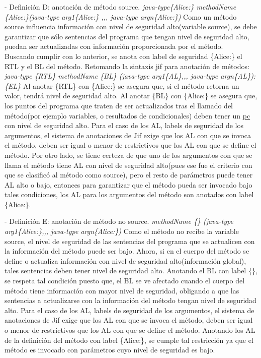- Definición D: anotación de método source.\newline 
\emph{java-type\{Alice:\}  methodName \{Alice:\}(java-type arg1\{Alice:\} ,,,
java-type argn\{Alice:\})}
Como un método source influencia información con nivel de seguridad alto(variable
source), se debe garantizar que sólo sentencias del programa que tengan nivel de
seguridad alto, puedan ser actualizadas con información proporcionada por el método.\\
Buscando cumplir con lo anterior, se anota con label de
seguridad \{Alice:\} el RTL y el BL del método.
Retomando la sintaxis jif para anotación de métodos:\newline 
\emph{java-type \{RTL\} methodName \{BL\} (java-type arg1\{AL\},,, java-type argn\{AL\}):\{EL\} }\newline
Al anotar \{RTL\} con \{Alice:\} se asegura que, si el método retorna un valor,
tendrá nivel de seguridad alto.\newline
Al anotar \{BL\} con \{Alice:\} se asegura que, los puntos del programa que
traten de ser actualizados tras el llamado del método(por ejemplo variables, o
resultados de condicionales) deben tener un \underline{pc} con nivel de
seguridad alto.\newline
Para el caso de los AL, labels de seguridad de los argumentos, el sistema de
anotaciones de Jif exige que los AL con que se invoca el método, deben ser igual
o menor de restrictivos que los AL con que se define el método. 
Por otro lado, se tiene certeza de que uno de los argumentos con que se llama el
método tiene AL con nivel de seguridad alto(pues ese fue el criterio con que
se clasificó al método como source), pero el resto de parámetros puede tener AL
alto o bajo, entonces para garantizar que el método pueda ser invocado bajo
tales condiciones, los AL para los argumentos del método son anotados con
label \{Alice:\}.

- Definición E: anotación de método no source.\newline
\emph{methodName \{\} (java-type arg1\{Alice:\},,, java-type argn\{Alice:\})}\newline
Como el método no recibe la variable source, el nivel de seguridad de las
sentencias del programa que se actualicen con la información del método puede
ser bajo. Ahora,  si en el cuerpo del método se define o actualiza información
con nivel de seguridad alto(información global), tales sentencias deben tener
nivel de seguridad alto.
Anotando el BL con label {\{\}}, se respeta tal condición puesto que,
el BL se ve afectado cuando el cuerpo del método tiene información con mayor
nivel de seguridad, obligando a que las sentencias a actualizarse con la
información del método tengan nivel de seguridad alto.\newline
Para el caso de los AL, labels de seguridad de los argumentos, el sistema de
anotaciones de Jif exige que los AL con que se invoca el método, deben ser igual
o menor de restrictivos que los AL con que se define el método. Anotando los AL
de la definición del método con label \{Alice:\}, se cumple tal restricción ya
que el método es invocado con parámetros cuyo nivel de seguridad es bajo.

